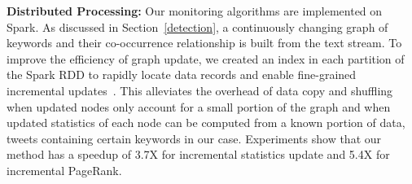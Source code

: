 
\noindent\textbf{Distributed Processing:}
Our monitoring algorithms are implemented on Spark.
As discussed in Section~\ref{detection}, a continuously changing graph of keywords and their co-occurrence relationship is built from the text stream.
To improve the efficiency of graph update, we created an index in each partition of the Spark RDD to rapidly locate data records and enable fine-grained incremental updates~\cite{ju2015igraph}.
This alleviates the overhead of data copy and shuffling when updated nodes only account for a small portion of the graph and when updated statistics of each node can be computed from a known portion of data, \ie tweets containing certain keywords in our case.
Experiments show that our method has a speedup of 3.7X for incremental statistics update and 5.4X for incremental PageRank.






